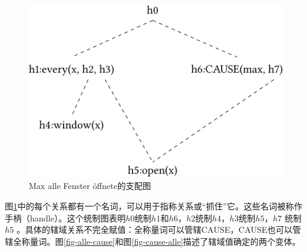 \begin{figure}
\centering
\includegraphics{Figures/max-alle-fenster-oeffnete-mrs-cropped.pdf}
\caption{Max alle Fenster öffnete的支配图\label{Abbildung-Max-alle-Fenster-oeffnete}}
\end{figure}%
图\ref{Abbildung-Max-alle-Fenster-oeffnete}中的每个关系都有一个名词，可以用于指称关系或“抓住”它。这些名词被称作手柄（handle）。这个统制图表明$h0$统制$h1$和$h6$，$h2$统制$h4$，$h3$统制$h5$，$h7$ 统制$h5$ 。具体的辖域关系不完全赋值：全称量词可以管辖CAUSE，CAUSE也可以管辖全称量词。图\ref{fig-alle-cause}和图\ref{fig-cause-alle}描述了辖域值确定的两个变体。
